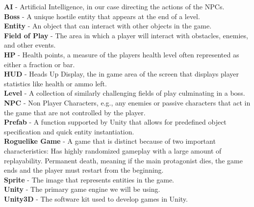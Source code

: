 \documentclass[12pt]{article}       %
\begin{document}
{\bf{AI}} - Artificial Intelligence, in our case directing the actions of the NPCs. \\
{\bf Boss} - A unique hostile entity that appears at the end of a level. \\
{\bf Entity} - An object that can interact with other objects in the game. \\
{\bf Field of Play} - The area in which a player will interact with obstacles, enemies, and other events. \\
{\bf HP} - Health points, a measure of the players health level often represented as either a fraction or bar. \\
{\bf HUD} - Heads Up Display, the in game area of the screen that displays player statistics like health or ammo left. \\
{\bf Level} - A collection of similarly challenging fields of play culminating in a boss. \\
{\bf NPC} - Non Player Characters, e.g., any enemies or passive characters that act in the game that are not controlled by the player. \\
{\bf Prefab} - A function supported by Unity that allows for predefined object specification and quick entity instantiation. \\
{\bf Roguelike Game} - A game that is distinct because of two important characteristics:
Has highly randomized gameplay with a large amount of replayability. 
Permanent death, meaning if the main protagonist dies, the game ends and the player must restart from the beginning. \\
{\bf Sprite} - The image that represents entities in the game. \\
{\bf Unity} - The primary game engine we will be using. \\
{\bf Unity3D} - The software kit used to develop games in Unity. \\
\end{document}
